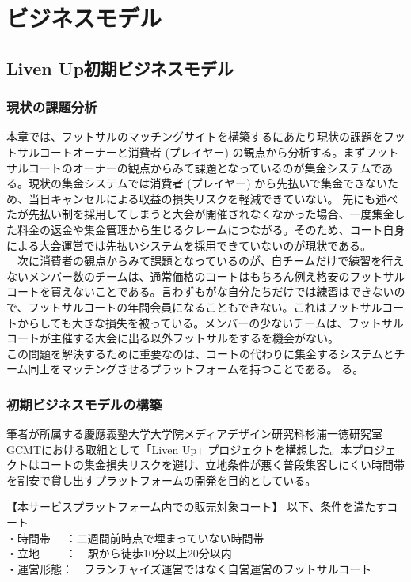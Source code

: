 \chapter{ビジネスモデル}
\label{intro}


\section{Liven Up初期ビジネスモデル}
\subsection{現状の課題分析}

本章では、フットサルのマッチングサイトを構築するにあたり現状の課題をフットサルコートオーナーと消費者 (プレイヤー) の観点から分析する。まずフットサルコートのオーナーの観点からみて課題となっているのが集金システムである。現状の集金システムでは消費者 (プレイヤー) から先払いで集金できないため、当日キャンセルによる収益の損失リスクを軽減できていない。
先にも述べたが先払い制を採用してしまうと大会が開催されなくなかった場合、一度集金した料金の返金や集金管理から生じるクレームにつながる。そのため、コート自身による大会運営では先払いシステムを採用できていないのが現状である。
\\　次に消費者の観点からみて課題となっているのが、自チームだけで練習を行えないメンバー数のチームは、通常価格のコートはもちろん例え格安のフットサルコートを買えないことである。言わずもがな自分たちだけでは練習はできないので、フットサルコートの年間会員になることもできない。これはフットサルコートからしても大きな損失を被っている。メンバーの少ないチームは、フットサルコートが主催する大会に出る以外フットサルをするを機会がない。
\\ この問題を解決するために重要なのは、コートの代わりに集金するシステムとチーム同士をマッチングさせるプラットフォームを持つことである。
る。

\subsection{初期ビジネスモデルの構築}
筆者が所属する慶應義塾大学大学院メディアデザイン研究科杉浦一徳研究室GCMTにおける取組として「Liven Up」プロジェクトを構想した。本プロジェクトはコートの集金損失リスクを避け、立地条件が悪く普段集客しにくい時間帯を割安で貸し出すプラットフォームの開発を目的としている。

【本サービスプラットフォーム内での販売対象コート】
以下、条件を満たすコート
\\・時間帯　 ：二週間前時点で埋まっていない時間帯
\\・立地　　 ：　駅から徒歩10分以上20分以内
\\・運営形態：　フランチャイズ運営ではなく自営運営のフットサルコート

